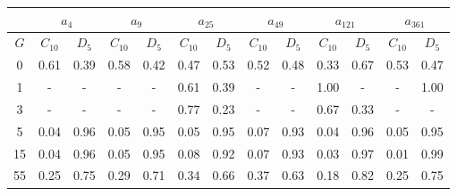 \begin{table}[h]
   \begin{center}
        \begin{tabular}{c|c|c|c|c|c|c|c|c|c|c|c|c}
            \toprule
            & \multicolumn{2}{c|}{$a_{4}$} & \multicolumn{2}{c|}{$a_{9}$} & \multicolumn{2}{c|}{$a_{25}$} & \multicolumn{2}{c|}{$a_{49}$} & \multicolumn{2}{c|}{$a_{121}$} & \multicolumn{2}{c}{$a_{361}$} \\
            \midrule
            $G$ & $C_{10}$ & $D_{5}$ & $C_{10}$ & $D_{5}$ & $C_{10}$ & $D_{5}$ & $C_{10}$ & $D_{5}$ & $C_{10}$ & $D_{5}$ & $C_{10}$ & $D_{5}$ \\
            \midrule
            0 & 0.61 & 0.39 & 0.58 & 0.42 & 0.47 & 0.53 & 0.52 & 0.48 & 0.33 & 0.67 & 0.53 & 0.47 \\
            1 & - & - & - & - & 0.61 & 0.39 & - & - & 1.00 & - & - & 1.00 \\
            3 & - & - & - & - & 0.77 & 0.23 & - & - & 0.67 & 0.33 & - & - \\
            5 & 0.04 & 0.96 & 0.05 & 0.95 & 0.05 & 0.95 & 0.07 & 0.93 & 0.04 & 0.96 & 0.05 & 0.95 \\
            15 & 0.04 & 0.96 & 0.05 & 0.95 & 0.08 & 0.92 & 0.07 & 0.93 & 0.03 & 0.97 & 0.01 & 0.99 \\
            55 & 0.25 & 0.75 & 0.29 & 0.71 & 0.34 & 0.66 & 0.37 & 0.63 & 0.18 & 0.82 & 0.25 & 0.75 \\
            \bottomrule
        \end{tabular}
   \end{center}
\end{table}

